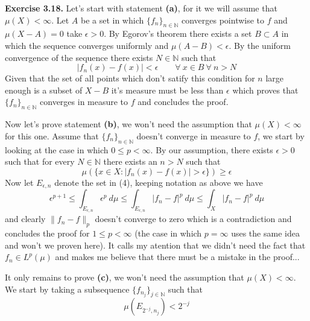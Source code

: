 \documentclass{article}
\begin{document}
\begin{exercise}\textbf{Exercise 3.18.}
    Let's start with statement \textbf{(a)}, for it we will assume that $\mu \left( X \right) < \infty $. Let $A$ be a set in which $\{f_n\}_{n \in \mathbb{N}}$ converges pointwise to $f$ and $\mu \left( X-A \right) = 0$ take $\epsilon > 0$. By Egorov's theorem there exists a set $B \subset A$ in which the sequence converges uniformly and $\mu \left( A-B \right)  < \epsilon$. By the uniform convergence of the sequence there exists $N \in \mathbb{N}$ such that
    \[
        |f_n \left( x \right) - f \left( x \right) | < \epsilon \qquad \forall\ x \in B\ \forall\ n > N
    \]
    Given that the set of all points which don't satify this condition for $n$ large enough is a subset of $X-B$ it's measure must be less than $\epsilon$ which proves that $\{f_n\}_{n \in \mathbb{N}}$ converges in measure to $f$ and concludes the proof. 

    Now let's prove statement \textbf{(b)}, we won't need the assumption that $\mu \left( X \right) < \infty$ for this one. Assume that $\{f_n\}_{n \in \mathbb{N}}$ doesn't converge in measure to $f$, we start by looking at the case in which $0 \le p < \infty$. By our assumption, there exists $\epsilon > 0$ such that for every $N \in \mathbb{N}$ there exists an $n > N$ such that
    \begin{equation}
        \mu \left( \{ x \in X : |f_n \left( x \right) - f \left( x \right) | > \epsilon \} \right) \ge \epsilon
    \end{equation}
    Now let $E_{\epsilon, n}$ denote the set in (4), keeping notation as above we have
    \[
        \epsilon^{p+1} \le \int_{E_{\epsilon,n}} \epsilon^p \: d\mu \le \int_{E_{\epsilon,n}} |f_n-f|^p\: d\mu \le \int_X |f_n-f|^p\: d\mu 
    \]
    and clearly $\|f_n-f\|_p $ doesn't converge to zero which is a contradiction and concludes the proof for $1 \le p < \infty$ (the case in which $p=\infty$ uses the same idea and won't we proven here). It calls my atention that we didn't need the fact that $f_n \in L^p \left( \mu \right) $ and makes me believe that there must be a mistake in the proof...

    It only remains to prove \textbf{(c)}, we won't need the assumption that $\mu \left( X \right) < \infty$. We start by taking a subsequence $\{f_{n_j}\}_{j \in \mathbb{N}}$ such that
    \begin{equation}
        \mu \left( E_{2^{-j}, n_j} \right) < 2^{-j}
    \end{equation}
\end{exercise}
\end{document}
